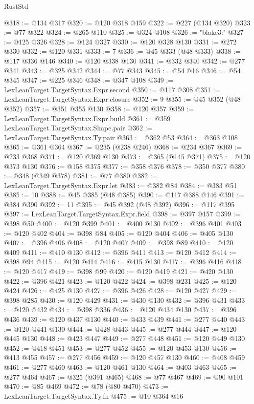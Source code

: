 \begin{lexlean}{RustStd}
\begin{coremodule}
{\begin{coremodule}
{{{{{{{{{{{{{{{{{{{{{{{{{{{{{{{{{{{{{{{{{{{{{{{{{{{{{{{{{{{{@318 := @134 @317
@320 := @120 @318 @159
@322 := @227 (@134 @320)
@323 := @77 @322
@324 := @265 @110
@325 := @324 @108
@326 := "blake3:"
@327 := @125 @326
@328 := @124 @327
@330 := @120 @328 @130
@331 := @272 @330
@332 := @120 @331
@333 := 7
@336 := @45 @333 (@48 @333)
@338 := @117 @336 @146
@340 := @120 @338 @130
@341 := @332 @340
@342 := @277 @341
@343 := @325 @342
@344 := @77 @343
@345 := @54 @16
@346 := @54 @345
@347 := @225 @346
@348 := @347 @108
@349 := LexLeanTarget.TargetSyntax.Expr.second
@350 := @117 @308
@351 := LexLeanTarget.TargetSyntax.Expr.closure
@352 := 9
@355 := @45 @352 (@48 @352)
@357 := @351 @355 @130
@358 := @120 @357
@359 := LexLeanTarget.TargetSyntax.Expr.build
@361 := @359 LexLeanTarget.TargetSyntax.Shape.pair
@362 := LexLeanTarget.TargetSyntax.Ty.pair
@363 := @362 @53
@364 := @363 @108
@365 := @361 @364
@367 := @235 (@238 @246)
@368 := @234 @367
@369 := @233 @368
@371 := @120 @369 @130
@373 := @365 (@145 @371)
@375 := @120 @373 @130
@376 := @158 @375
@377 := @358 @376
@378 := @350 @377
@380 := @348 (@349 @378)
@381 := @77 @380
@382 := LexLeanTarget.TargetSyntax.Expr.let
@383 := @382 @84
@384 := @383 @51
@385 := 10
@388 := @45 @385 (@48 @385)
@390 := @117 @388 @146
@391 := @384 @390
@392 := 11
@395 := @45 @392 (@48 @392)
@396 := @117 @395
@397 := LexLeanTarget.TargetSyntax.Expr.field
@398 := @397 @157
@399 := @398 @50
@400 := @120 @399
@401 := @400 @130
@402 := @396 @401
@403 := @120 @402
@404 := @398 @84
@405 := @120 @404
@406 := @405 @130
@407 := @396 @406
@408 := @120 @407
@409 := @398 @89
@410 := @120 @409
@411 := @410 @130
@412 := @396 @411
@413 := @120 @412
@414 := @398 @94
@415 := @120 @414
@416 := @415 @130
@417 := @396 @416
@418 := @120 @417
@419 := @398 @99
@420 := @120 @419
@421 := @420 @130
@422 := @396 @421
@423 := @120 @422
@424 := @398 @231
@425 := @120 @424
@426 := @425 @130
@427 := @396 @426
@428 := @120 @427
@429 := @398 @285
@430 := @120 @429
@431 := @430 @130
@432 := @396 @431
@433 := @120 @432
@434 := @398 @336
@436 := @120 @434 @130
@437 := @396 @436
@439 := @120 @437 @130
@440 := @433 @439
@441 := @277 @440
@443 := @120 @441 @130
@444 := @428 @443
@445 := @277 @444
@447 := @120 @445 @130
@448 := @423 @447
@449 := @277 @448
@451 := @120 @449 @130
@452 := @418 @451
@453 := @277 @452
@455 := @120 @453 @130
@456 := @413 @455
@457 := @277 @456
@459 := @120 @457 @130
@460 := @408 @459
@461 := @277 @460
@463 := @120 @461 @130
@464 := @403 @463
@465 := @277 @464
@467 := @325 (@391 @465)
@468 := @77 @467
@469 := @90 @101
@470 := @85 @469
@472 := @78 (@80 @470)
@473 := LexLeanTarget.TargetSyntax.Ty.fn
@475 := @10 @364 @16
}}}}}}}}}}}}}}}}}}}}}}}}}}}}}}}}}}}}}}}}}}}}}}}}}}}}}}}}}}}}
\end{coremodule}}
\end{coremodule}
\end{lexlean}
